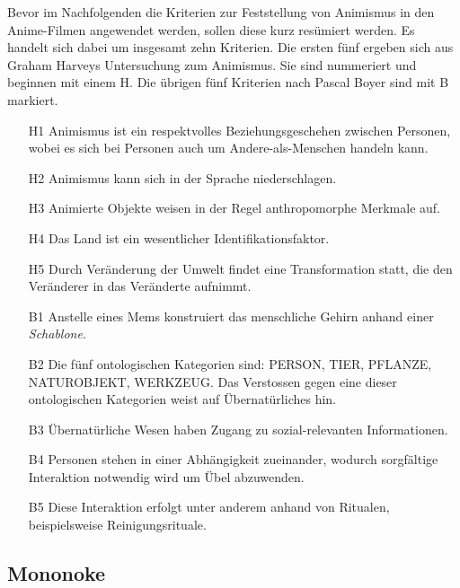 Bevor im Nachfolgenden die Kriterien zur Feststellung von Animismus in den Anime-Filmen angewendet werden, sollen diese kurz resümiert werden. Es handelt sich dabei um insgesamt zehn Kriterien. Die ersten fünf ergeben sich aus Graham Harveys Untersuchung zum Animismus. Sie sind nummeriert und beginnen mit einem H. Die übrigen fünf Kriterien nach Pascal Boyer sind mit B markiert.
\begin{itemize}
	\item [H1] Animismus ist ein respektvolles Beziehungsgeschehen zwischen Personen, wobei es sich bei Personen auch um Andere-als-Menschen handeln kann.
	\item [H2] Animismus kann sich in der Sprache niederschlagen.
	\item [H3] Animierte Objekte weisen in der Regel anthropomorphe Merkmale auf.
	\item [H4] Das Land ist ein wesentlicher Identifikationsfaktor.
	\item [H5] Durch Veränderung der Umwelt findet eine Transformation statt, die den Veränderer in das Veränderte aufnimmt.
	\item [B1] Anstelle eines Mems konstruiert das menschliche Gehirn anhand einer \emph{Schablone}.
	\item [B2] Die fünf ontologischen Kategorien sind: PERSON, TIER, PFLANZE, NATUROBJEKT, WERKZEUG. Das Verstossen gegen eine dieser ontologischen Kategorien weist auf Übernatürliches hin.
	\item [B3] Übernatürliche Wesen haben Zugang zu sozial-relevanten Informationen. 
	\item [B4] Personen stehen in einer Abhängigkeit zueinander, wodurch sorgfältige Interaktion notwendig wird um Übel abzuwenden.
	\item [B5] Diese Interaktion erfolgt unter anderem anhand von Ritualen, beispielsweise Reinigungsrituale.
\end{itemize} 

\subsection{Mononoke} 
